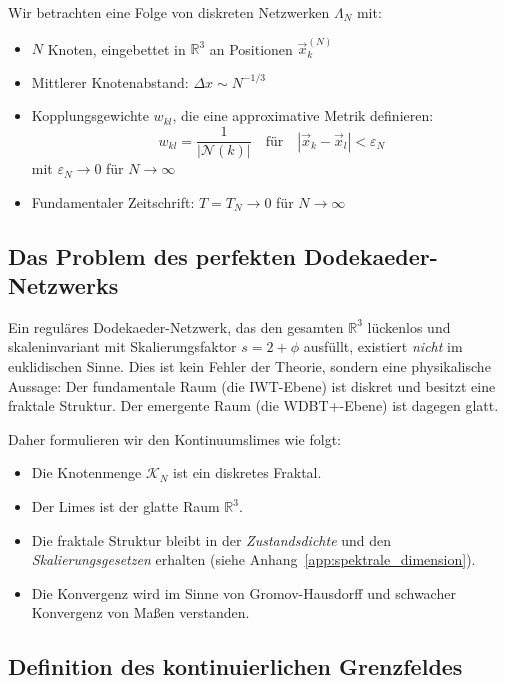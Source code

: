 Wir betrachten eine Folge von diskreten Netzwerken \( \Lambda_N \) mit:

\begin{itemize}
    \item \( N \) Knoten, eingebettet in \( \mathbb{R}^3 \) an Positionen \( \vec{x}_k^{(N)} \)
    \item Mittlerer Knotenabstand: \( \Delta x \sim N^{-1/3} \)
    \item Kopplungsgewichte \( w_{kl} \), die eine approximative Metrik definieren:
          \[
          w_{kl} = \frac{1}{|\mathcal{N}(k)|} \quad \text{für} \quad |\vec{x}_k - \vec{x}_l| < \varepsilon_N
          \]
          mit \( \varepsilon_N \to 0 \) für \( N \to \infty \)
    \item Fundamentaler Zeitschrift: \( T = T_N \to 0 \) für \( N \to \infty \)
\end{itemize}

\subsection{Das Problem des perfekten Dodekaeder-Netzwerks}
\label{sub:kontinuumslimes_dodekaeder_problem}

Ein reguläres Dodekaeder-Netzwerk, das den gesamten \( \mathbb{R}^3 \) lückenlos und
skaleninvariant mit Skalierungsfaktor \( s = 2+\phi \) ausfüllt, existiert \emph{nicht}
im euklidischen Sinne. Dies ist kein Fehler der Theorie, sondern eine physikalische
Aussage: Der fundamentale Raum (die IWT-Ebene) ist diskret und besitzt eine fraktale
Struktur. Der emergente Raum (die WDBT+-Ebene) ist dagegen glatt.

Daher formulieren wir den Kontinuumslimes wie folgt:
\begin{itemize}
    \item Die Knotenmenge \( \mathcal{K}_N \) ist ein diskretes Fraktal.
    \item Der Limes ist der glatte Raum \( \mathbb{R}^3 \).
    \item Die fraktale Struktur bleibt in der \emph{Zustandsdichte} und den
          \emph{Skalierungsgesetzen} erhalten (siehe Anhang~\ref{app:spektrale_dimension}).
    \item Die Konvergenz wird im Sinne von Gromov-Hausdorff und schwacher Konvergenz
          von Maßen verstanden.
\end{itemize}

\subsection{Definition des kontinuierlichen Grenzfeldes}
\label{sub:kontinuumslimes_grenzfeld}

